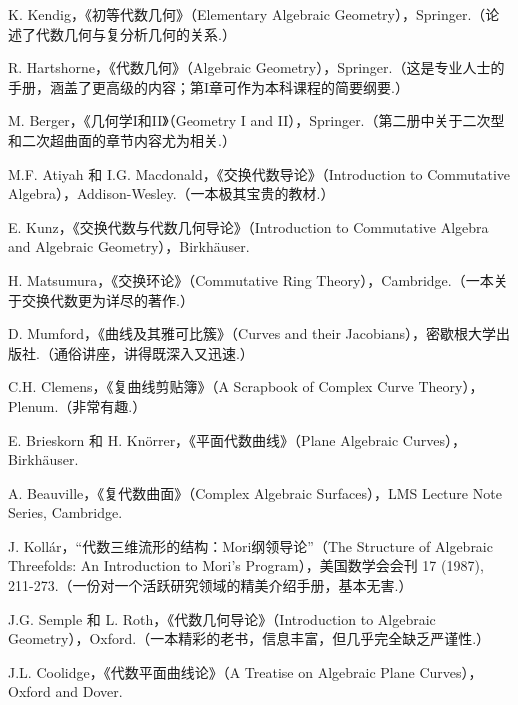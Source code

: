 K. Kendig，《初等代数几何》（Elementary Algebraic Geometry），Springer.（论述了代数几何与复分析几何的关系.）

R. Hartshorne，《代数几何》（Algebraic Geometry），Springer.（这是专业人士的手册，涵盖了更高级的内容；第I章可作为本科课程的简要纲要.）

M. Berger，《几何学I和II》（Geometry I and II），Springer.（第二册中关于二次型和二次超曲面的章节内容尤为相关.）

M.F. Atiyah 和 I.G. Macdonald，《交换代数导论》（Introduction to Commutative Algebra），Addison-Wesley.（一本极其宝贵的教材.）

E. Kunz，《交换代数与代数几何导论》（Introduction to Commutative Algebra and Algebraic Geometry），Birkhäuser.

H. Matsumura，《交换环论》（Commutative Ring Theory），Cambridge.（一本关于交换代数更为详尽的著作.）

D. Mumford，《曲线及其雅可比簇》（Curves and their Jacobians），密歇根大学出版社.（通俗讲座，讲得既深入又迅速.）

C.H. Clemens，《复曲线剪贴簿》（A Scrapbook of Complex Curve Theory），Plenum.（非常有趣.）

E. Brieskorn 和 H. Knörrer，《平面代数曲线》（Plane Algebraic Curves），Birkhäuser.

A. Beauville，《复代数曲面》（Complex Algebraic Surfaces），LMS Lecture Note Series, Cambridge.

J. Kollár，“代数三维流形的结构：Mori纲领导论”（The Structure of Algebraic Threefolds: An Introduction to Mori's Program），美国数学会会刊 17 (1987), 211-273.（一份对一个活跃研究领域的精美介绍手册，基本无害.）

J.G. Semple 和 L. Roth，《代数几何导论》（Introduction to Algebraic Geometry），Oxford.（一本精彩的老书，信息丰富，但几乎完全缺乏严谨性.）

J.L. Coolidge，《代数平面曲线论》（A Treatise on Algebraic Plane Curves），Oxford and Dover.